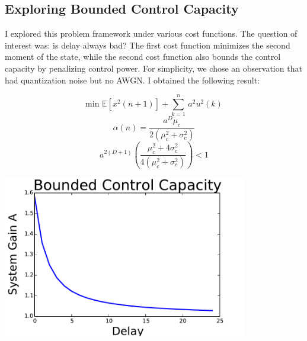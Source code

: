 \documentclass[11pt]{article}
\begin{document}
\subsection*{Exploring Bounded Control Capacity}
I explored this problem framework under various cost functions. The question of interest was: is delay always bad? The first cost function minimizes the second moment of the state, while the second cost function also bounds the control capacity by penalizing control power. For simplicity, we chose an observation that had quantization noise but no AWGN. I obtained the following result:\\
\begin{minipage}{0.5\textwidth}
\[  \text{min } \mathbb{E}[x^2(n+1)] + \sum_{k=1}^n \, a^2 u^2(k) \]
\[ \alpha(n) = \frac{a^D \mu_c}{2(\mu_c^2 + \sigma_c^2)} \]
\[ a^{2(D+1)} \left( \frac{\mu_c^2 + 4\sigma_c^2}{4(\mu_c^2 + \sigma_c^2)} \right) < 1 \]
\end{minipage} \begin{minipage}{0.5\textwidth}
\begin{center}
\includegraphics[width=0.8\textwidth]{160131_newcost}
\end{center}
\end{minipage}

\end{document}
